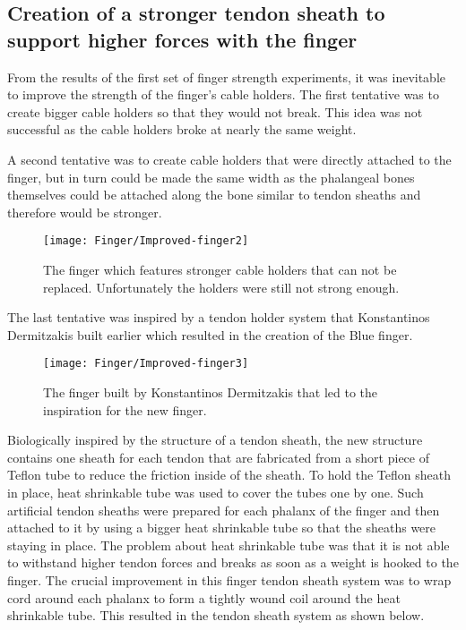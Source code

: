 \documentclass[main]{subfiles}
\begin{document}
\subsection{Creation of a stronger tendon sheath to support higher forces with the finger}
From the results of the first set of finger strength experiments, it was inevitable to improve the strength of the finger's cable holders. The first tentative was to create bigger cable holders so that they would not break. This idea was not successful as the cable holders broke at nearly the same weight.

A second tentative was to create cable holders that were directly attached to the finger, but in turn could be made the same width as the phalangeal bones themselves could be attached along the bone similar to tendon sheaths and therefore would be stronger. 
 
\begin{figure}[htp]
\centering
\texttt{[image: Finger/Improved-finger2]}
\caption[Finger with stronger tendon holders]{The finger which features stronger cable holders that can not be replaced. Unfortunately the holders were still not strong enough.}
\label{big-holders-finger}
\end{figure}

The last tentative was inspired by a tendon holder system that Konstantinos Dermitzakis built earlier which resulted in the creation of the Blue finger. 

\begin{figure}[htp]
\centering
\texttt{[image: Finger/Improved-finger3]}
\caption[Inspiring finger model]{The finger built by Konstantinos Dermitzakis that led to the inspiration for the new finger.}
\label{konstantinos-finger}
\end{figure}

Biologically inspired by the structure of a tendon sheath, the new structure contains one sheath for each tendon that are fabricated from a short piece of Teflon tube to reduce the friction inside of the sheath. To hold the Teflon sheath in place, heat shrinkable tube was used to cover the tubes one by one. Such artificial tendon sheaths were prepared for each phalanx of the finger and then attached to it by using a bigger heat shrinkable tube so that the sheaths were staying in place. The problem about heat shrinkable tube was that it is not able to withstand higher tendon forces and breaks as soon as a weight is hooked to the finger. The crucial improvement in this finger tendon sheath system was to wrap cord around each phalanx to form a tightly wound coil around the heat shrinkable tube. This resulted in the tendon sheath system as shown below.
\end{document}
